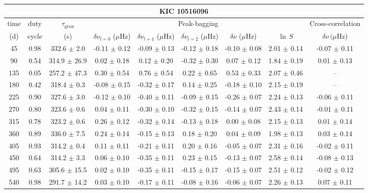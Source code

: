 \documentclass[twocolumn]{aastex61}%
\begin{document}
\begin{table*}[ht]\centering\fontsize{9.}{7.}\selectfont
\begin{tabular}{ccc|ccccc|c}
\multicolumn{9}{c}{KIC 10516096}\\ \hline\hline
time & duty & $\tau_\text{gran}$ &\multicolumn{5}{c|}{Peak-bagging}&Cross-correlation\\
(d)& cycle & (s)&$\delta\nu_{l=0}$ ($\mu$Hz) & $\delta\nu_{l=1}$ ($\mu$Hz) & $\delta\nu_{l=2}$ ($\mu$Hz) & $\delta\nu$ ($\mu$Hz)& $\ln\,S$ & $\delta\nu\,(\mu$Hz)\\\hline
45 & 0.98 & 332.6 $\pm$ 2.0 & -0.11 $\pm$ 0.12 & -0.09 $\pm$ 0.13 & -0.12 $\pm$ 0.18 & -0.10 $\pm$ 0.08 & 2.01 $\pm$ 0.14 & -0.07 $\pm$ 0.11\\
90 & 0.54 & 314.9 $\pm$ 26.9 & 0.02 $\pm$ 0.18 & 0.12 $\pm$ 0.20 & -0.32 $\pm$ 0.30 & 0.07 $\pm$ 0.12 & 1.84 $\pm$ 0.19 & 0.01 $\pm$ 0.13\\
135 & 0.05 & 257.2 $\pm$ 47.3 & 0.30 $\pm$ 0.54 & 0.76 $\pm$ 0.54 & 0.22 $\pm$ 0.65 & 0.53 $\pm$ 0.33 & 2.07 $\pm$ 0.46 & --\\
180 & 0.42 & 318.4 $\pm$ 0.3 & -0.08 $\pm$ 0.15 & -0.32 $\pm$ 0.17 & 0.14 $\pm$ 0.25 & -0.18 $\pm$ 0.10 & 2.15 $\pm$ 0.19 & --\\
225 & 0.90 & 327.6 $\pm$ 3.0 & -0.12 $\pm$ 0.10 & -0.40 $\pm$ 0.11 & -0.09 $\pm$ 0.15 & -0.26 $\pm$ 0.07 & 2.24 $\pm$ 0.13 & -0.06 $\pm$ 0.11\\
270 & 0.80 & 323.6 $\pm$ 0.6 & 0.04 $\pm$ 0.11 & -0.30 $\pm$ 0.10 & -0.32 $\pm$ 0.15 & -0.14 $\pm$ 0.07 & 2.43 $\pm$ 0.14 & -0.01 $\pm$ 0.11\\
315 & 0.78 & 323.2 $\pm$ 0.6 & 0.26 $\pm$ 0.12 & -0.32 $\pm$ 0.14 & -0.13 $\pm$ 0.18 & 0.00 $\pm$ 0.08 & 2.15 $\pm$ 0.13 & 0.01 $\pm$ 0.14\\
360 & 0.89 & 336.0 $\pm$ 7.5 & 0.24 $\pm$ 0.14 & -0.15 $\pm$ 0.13 & 0.18 $\pm$ 0.20 & 0.04 $\pm$ 0.09 & 1.98 $\pm$ 0.13 & 0.03 $\pm$ 0.14\\
405 & 0.93 & 314.2 $\pm$ 0.4 & 0.11 $\pm$ 0.11 & -0.21 $\pm$ 0.11 & 0.20 $\pm$ 0.16 & -0.05 $\pm$ 0.07 & 2.31 $\pm$ 0.16 & -0.02 $\pm$ 0.11\\
450 & 0.64 & 314.2 $\pm$ 3.3 & 0.06 $\pm$ 0.10 & -0.35 $\pm$ 0.11 & 0.23 $\pm$ 0.15 & -0.13 $\pm$ 0.07 & 2.58 $\pm$ 0.14 & -0.08 $\pm$ 0.13\\
495 & 0.63 & 305.6 $\pm$ 15.5 & 0.02 $\pm$ 0.10 & -0.35 $\pm$ 0.11 & -0.15 $\pm$ 0.17 & -0.15 $\pm$ 0.07 & 2.51 $\pm$ 0.12 & -0.02 $\pm$ 0.12\\
540 & 0.98 & 291.7 $\pm$ 14.2 & 0.03 $\pm$ 0.10 & -0.17 $\pm$ 0.11 & -0.08 $\pm$ 0.16 & -0.06 $\pm$ 0.07 & 2.26 $\pm$ 0.13 & 0.07 $\pm$ 0.11\\

\end{tabular}
\end{table*}
\end{document}
